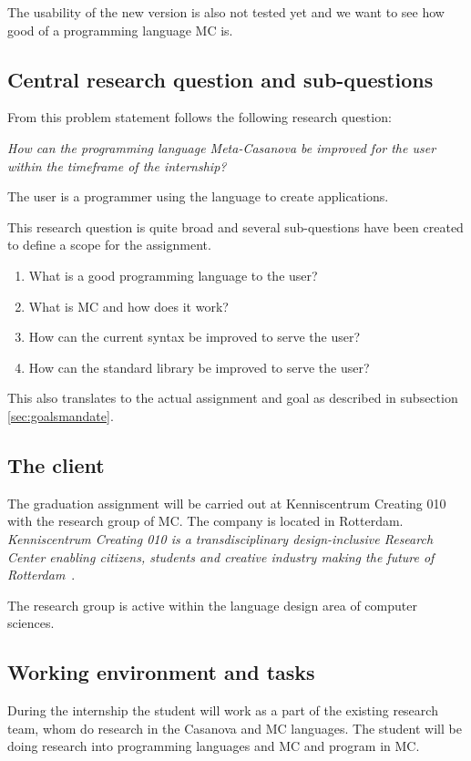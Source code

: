 The usability of the new version is also not tested yet and we want to see how good of a programming language MC is.

\subsection{Central research question and sub-questions}
From this problem statement follows the following research question:

\emph{How can the programming language Meta-Casanova be improved for the user within the timeframe of the internship?}

The user is a programmer using the language to create applications.

This research question is quite broad and several sub-questions have been created to define a scope for the assignment.

\begin{enumerate}[noitemsep]
   \item What is a good programming language to the user?
   \item What is MC and how does it work?
   \item How can the current syntax be improved to serve the user?
   \item How can the standard library be improved to serve the user?
\end{enumerate}

This also translates to the actual assignment and goal as described in subsection \ref{sec:goalsmandate}.

\subsection{The client}\label{sec:clientmandate}
The graduation assignment will be carried out at Kenniscentrum Creating 010 with the research group of MC.
The company is located in Rotterdam.
\textit{Kenniscentrum Creating 010 is a transdisciplinary design-inclusive Research Center enabling citizens, students and creative industry making the future of Rotterdam}~\cite{creating2016home}.

The research group is active within the language design area of computer sciences.


\subsection{Working environment and tasks}\label{sec:workenvmandate}
During the internship the student will work as a part of the existing research team, whom do research in the Casanova and MC languages.
The student will be doing research into programming languages and MC and program in MC.

